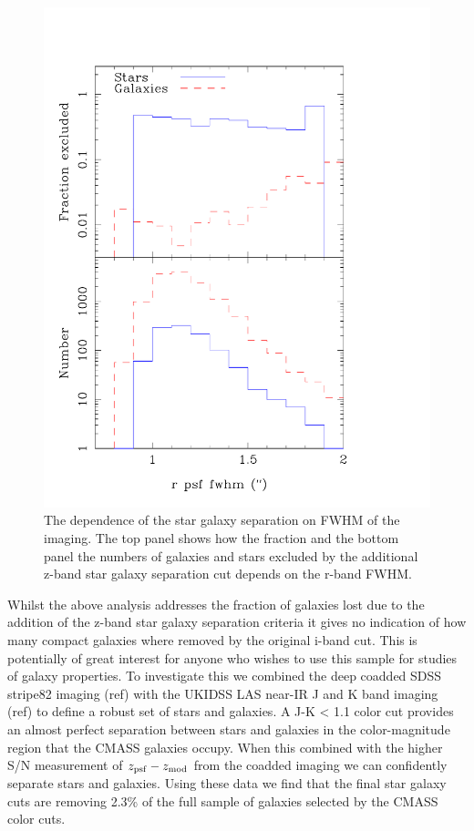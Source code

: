 \documentclass[preprint]{aastex}
\newcommand{\zpsf}{z_{\rm psf}}
\newcommand{\zmod}{z_{\rm mod}}
\begin{document}
\begin{figure}
\includegraphics[width=0.95\columnwidth]{plots/star_gal_chunk2_psf_paper}
\caption{The dependence of the star galaxy separation on FWHM of the imaging. 
The top panel shows how the fraction and the bottom panel the numbers of
galaxies and stars excluded by the additional z-band star galaxy separation cut
depends on the r-band FWHM. }
\label{fig:stargal_psf}
\end{figure}


Whilst the above analysis addresses the fraction of galaxies lost due to the
addition of the z-band star galaxy separation criteria it gives no indication of
how many compact galaxies where removed by the original i-band cut. This is
potentially of great interest for anyone who wishes to use this sample for
studies of galaxy properties. To investigate this we combined the deep coadded
SDSS stripe82 imaging (ref) with the UKIDSS LAS near-IR J and K band imaging
(ref) to define a robust set of stars and galaxies. A J-K < 1.1 color cut
provides an almost perfect separation between stars and galaxies in the
color-magnitude region that the CMASS galaxies occupy. When this combined with
the higher S/N measurement of $\zpsf-\zmod$ from the coadded imaging we can
confidently separate stars and galaxies. Using these data we find that the final
star galaxy cuts are removing 2.3\% of the full sample of galaxies selected by
the CMASS color cuts.
\end{document}
